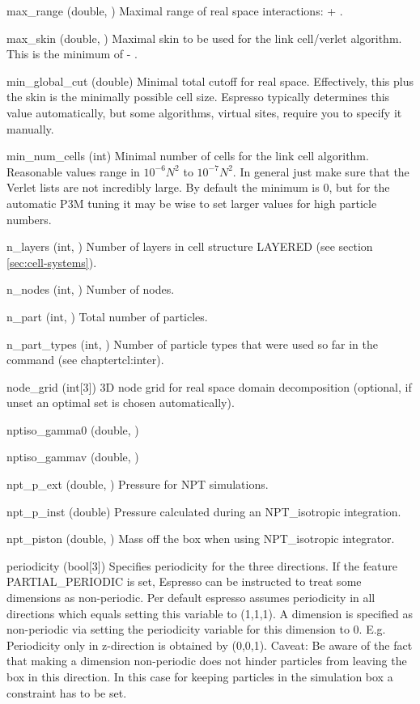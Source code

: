 \begin{globvar}
\item[max_range] (double, \ro) Maximal range of real space
  interactions:  + .
\item[max_skin] (double, \ro) Maximal skin to be used for the link
  cell/verlet algorithm. This is the minimum of  -
  .
\item[min_global_cut] (double) Minimal total cutoff for real space.
  Effectively, this plus the skin is the minimally possible cell size.
  Espresso typically determines this value automatically, but some
  algorithms, \eg{} virtual sites, require you to specify it manually.
\item[min_num_cells] (int) Minimal number of cells for the link cell
  algorithm. Reasonable values range in $10^{-6} N^2$ to $10^{-7}
  N^2$. In general just make sure that the Verlet lists are not
  incredibly large. By default the minimum is 0, but for the automatic
  P3M tuning it may be wise to set larger values for high particle
  numbers.
\item[n_layers] (int, \ro) Number of layers in cell structure LAYERED
  (see section \vref{sec:cell-systems}).
\item[n_nodes] (int, \ro) Number of nodes.
\item[n_part] (int, \ro) Total number of particles.
\item[n_part_types] (int, \ro) Number of particle types that were
  used so far in the  command (see chapter{tcl:inter}).
\item[node_grid] (int[3]) 3D node grid for real space domain
  decomposition (optional, if unset an optimal set is chosen
  automatically).
\item[nptiso_gamma0] (double, \ro)
\item[nptiso_gammav] (double, \ro)
\item[npt_p_ext] (double, \ro) Pressure for NPT simulations.
\item[npt_p_inst] (double) Pressure calculated during an
  NPT_isotropic integration.
\item[npt_piston] (double, \ro) Mass off the box when using NPT_isotropic
  integrator.
\item[periodicity] (bool[3]) Specifies periodicity for the three
  directions. If the feature PARTIAL_PERIODIC is set, Espresso can be instructed to treat some dimensions as non-periodic. Per default espresso assumes periodicity in all directions which equals setting this variable to (1,1,1). A dimension is specified as non-periodic via setting the periodicity variable for this dimension to 0. E.g. Periodicity only in z-direction is obtained by (0,0,1). Caveat: Be aware of the fact that making a dimension non-periodic does not hinder particles from leaving the box in this direction. In this case for keeping particles in the simulation box a constraint has to be set.

\end{globvar}
